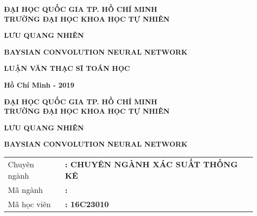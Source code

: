 \begin{titlepage}
\fontsize{14pt}{23pt}\selectfont
\newpage
\thispagestyle{empty}%

\begin{center}
\large\textbf{ ĐẠI HỌC QUỐC GIA TP. HỒ CHÍ MINH} \\
\large \textbf{TRƯỜNG ĐẠI HỌC KHOA HỌC TỰ NHIÊN} \\


\vspace*{2.5cm}

{\bf \large LƯU QUANG NHIÊN}
\vspace*{4cm}

\begin{center}
\Large{\textbf{BAYSIAN CONVOLUTION NEURAL NETWORK}}\\
\end{center}

\vspace*{3cm}

\begin{center}
\bf \large LUẬN VĂN THẠC SĨ TOÁN HỌC\\
\end{center}

\vfill

{\large\bf Hồ Chí Minh - 2019}
\end{center}
\newpage
\thispagestyle{empty}
\begin{center}
\large\textbf{ ĐẠI HỌC QUỐC GIA TP. HỒ CHÍ MINH} \\
\large \textbf{TRƯỜNG ĐẠI HỌC KHOA HỌC TỰ NHIÊN} \\

\vspace*{2.5cm}

{\bf \large LƯU QUANG NHIÊN }
\vspace*{4cm}

\begin{center}
\Large{\textbf{BAYSIAN CONVOLUTION NEURAL NETWORK}}\\
\end{center}

\vspace*{2cm}

\begin{tabular}{l  l }
\large Chuyên ngành&\bf \large: \quad CHUYÊN NGÀNH XÁC SUẤT THỐNG KÊ\\ 
\large Mã ngành&\bf \large: \quad 60460106 \\
\large Mã học viên&\bf \large: \quad 16C23010 \\
\end{tabular}
\vspace*{2cm}


\end{center}
\end{titlepage}
